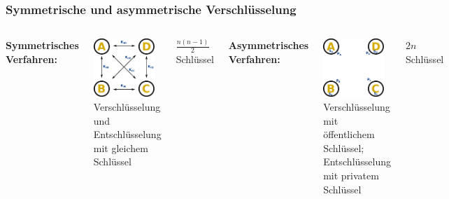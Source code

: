 \documentclass{beamer}
\begin{document}
\begin{frame}
\frametitle{Symmetrische und asymmetrische Verschlüsselung}
\begin{columns}

	\textbf{Symmetrisches Verfahren:}
	
	\includegraphics[width=0.9\textwidth]{images/symmetric.pdf}\\

	\small{Verschlüsselung und Entschlüsselung mit gleichem Schlüssel}

	\(\frac{n(n-1)}{2}\) Schlüssel

\pause
{}
	\textbf{Asymmetrisches Verfahren:}

	\includegraphics[width=0.9\textwidth]{images/asymmetric.pdf}\\

	\small{Verschlüsselung mit öffentlichem Schlüssel; Entschlüsselung mit privatem Schlüssel}

	\(2n\) Schlüssel

\end{columns}
\end{frame}
\end{document}
